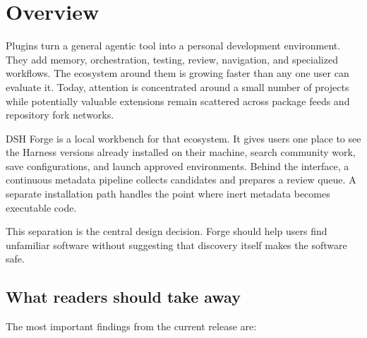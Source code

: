 \documentclass[10pt,twocolumn]{article}
\begin{document}
\section{Overview}

Plugins turn a general agentic tool into a personal development environment. They add memory, orchestration, testing, review, navigation, and specialized workflows. The ecosystem around them is growing faster than any one user can evaluate it. Today, attention is concentrated around a small number of projects while potentially valuable extensions remain scattered across package feeds and repository fork networks.

DSH Forge is a local workbench for that ecosystem. It gives users one place to see the Harness versions already installed on their machine, search community work, save configurations, and launch approved environments. Behind the interface, a continuous metadata pipeline collects candidates and prepares a review queue. A separate installation path handles the point where inert metadata becomes executable code.

This separation is the central design decision. Forge should help users find unfamiliar software without suggesting that discovery itself makes the software safe.

\subsection{What readers should take away}

The most important findings from the current release are:
\end{document}
